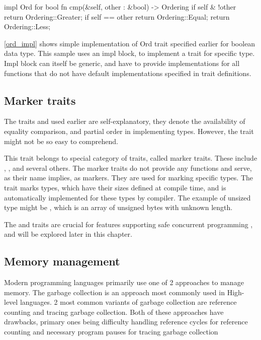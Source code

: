 \begin{code}[language=rust,label={ord_impl},caption={Trait implementation}]
impl Ord for bool {
    fn cmp(&self, other : &bool) -> Ordering {
        if self & !other {
            return Ordering::Greater;
        }
        if self == other {
            return Ordering::Equal;
        }
        return Ordering::Less;
    }
}
\end{code}

\autoref{ord_impl} shows simple implementation of Ord trait specified earlier for boolean data type. This sample
uses an impl block, to implement a trait for specific type. Impl block can itself be generic, and have to provide
implementations for all functions that do not have default implementations specified in trait definitions.

\subsection{Marker traits}
The traits  and  used earlier are self-explanatory, they denote the availability of equality comparison, and partial order
in implementing types. However, the  trait might not be so easy to comprehend.

This trait belongs to special category of traits, called marker traits. These include  , ,  and several others.
The marker traits do not provide any functions and serve, as their name implies, as markers. They are used for marking specific
types. The  trait marks types, which have their sizes defined at compile time, and is automatically implemented
for these types by compiler. The example of unsized type might be \type{[u8]} , which is an array of unsigned bytes with unknown length.

The  and  traits are crucial for features supporting safe concurrent programming , and will be explored later in
this chapter.

\subsection{Memory management}
Modern programming languages primarily use one of 2 approaches to manage memory.
The garbage collection is an approach most commonly used in High-level languages. 2 most common variants of
garbage collection are reference counting and tracing garbage collection. Both of these approaches have drawbacks, primary ones being
difficulty handling reference cycles for reference counting and necessary program pauses for tracing garbage collection


